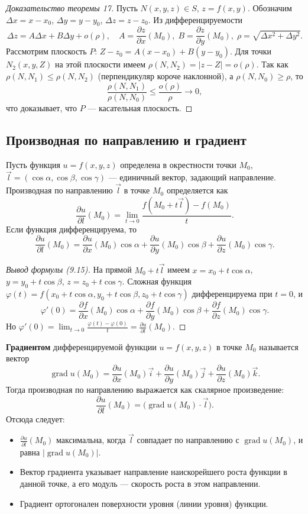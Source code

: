 \documentclass{article}
\theoremstyle{definition}
\begin{document}
\begin{proof}[Доказательство теоремы 17]
Пусть $N(x,y,z)\in S$, $z=f(x,y)$. Обозначим $\Delta x=x-x_0$, $\Delta y=y-y_0$, $\Delta z=z-z_0$. Из дифференцируемости
\[
\Delta z = A\Delta x + B\Delta y + o(\rho),\quad A=\frac{\partial z}{\partial x}(M_0),\;B=\frac{\partial z}{\partial y}(M_0),\;\rho=\sqrt{\Delta x^2+\Delta y^2}.
\]
Рассмотрим плоскость $P$: $Z-z_0 = A(x-x_0)+B(y-y_0)$. Для точки $N_2(x,y,Z)$ на этой плоскости имеем $\rho(N,N_2)=|z-Z|=o(\rho)$. Так как $\rho(N,N_1)\le\rho(N,N_2)$ (перпендикуляр короче наклонной), а $\rho(N,N_0)\ge\rho$, то
\[
\frac{\rho(N,N_1)}{\rho(N,N_0)}\le\frac{o(\rho)}{\rho}\to0,
\]
что доказывает, что $P$ — касательная плоскость.
\end{proof}

\subsection{Производная по направлению и градиент}
Пусть функция $u=f(x,y,z)$ определена в окрестности точки $M_0$, $\vec{l}=(\cos\alpha,\cos\beta,\cos\gamma)$ — единичный вектор, задающий направление. Производная по направлению $\vec{l}$ в точке $M_0$ определяется как
\[
\frac{\partial u}{\partial l}(M_0)=\lim_{t\to0}\frac{f(M_0+t\vec{l})-f(M_0)}{t}.
\]
Если функция дифференцируема, то
\[
\frac{\partial u}{\partial l}(M_0)=\frac{\partial u}{\partial x}(M_0)\cos\alpha+\frac{\partial u}{\partial y}(M_0)\cos\beta+\frac{\partial u}{\partial z}(M_0)\cos\gamma. \tag{9.15}
\]

\begin{proof}[Вывод формулы (9.15)]
На прямой $M_0+t\vec{l}$ имеем $x=x_0+t\cos\alpha$, $y=y_0+t\cos\beta$, $z=z_0+t\cos\gamma$. Сложная функция $\varphi(t)=f(x_0+t\cos\alpha,y_0+t\cos\beta,z_0+t\cos\gamma)$ дифференцируема при $t=0$, и
\[
\varphi'(0)=\frac{\partial f}{\partial x}(M_0)\cos\alpha+\frac{\partial f}{\partial y}(M_0)\cos\beta+\frac{\partial f}{\partial z}(M_0)\cos\gamma.
\]
Но $\varphi'(0)=\lim_{t\to0}\frac{\varphi(t)-\varphi(0)}{t}=\frac{\partial u}{\partial l}(M_0)$.
\end{proof}

\textbf{Градиентом} дифференцируемой функции $u=f(x,y,z)$ в точке $M_0$ называется вектор
\[
\operatorname{grad} u(M_0)=\frac{\partial u}{\partial x}(M_0)\vec{i}+\frac{\partial u}{\partial y}(M_0)\vec{j}+\frac{\partial u}{\partial z}(M_0)\vec{k}.
\]
Тогда производная по направлению выражается как скалярное произведение:
\[
\frac{\partial u}{\partial l}(M_0)=\bigl(\operatorname{grad}u(M_0)\cdot\vec{l}\bigr).
\]
Отсюда следует:
\begin{itemize}
    \item $\frac{\partial u}{\partial l}(M_0)$ максимальна, когда $\vec{l}$ совпадает по направлению с $\operatorname{grad}u(M_0)$, и равна $|\operatorname{grad}u(M_0)|$.
    \item Вектор градиента указывает направление наискорейшего роста функции в данной точке, а его модуль — скорость роста в этом направлении.
    \item Градиент ортогонален поверхности уровня (линии уровня) функции.
\end{itemize}
\end{document}
